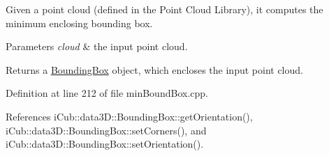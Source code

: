 Given a point cloud (defined in the Point Cloud Library), it computes the minimum enclosing bounding box. 


\begin{DoxyParams}{Parameters}
{\em cloud} & the input point cloud. \\
\hline
\end{DoxyParams}
\begin{DoxyReturn}{Returns}
a \hyperlink{classiCub_1_1data3D_1_1BoundingBox}{Bounding\+Box} object, which encloses the input point cloud. 
\end{DoxyReturn}


Definition at line 212 of file min\+Bound\+Box.\+cpp.



References i\+Cub\+::data3\+D\+::\+Bounding\+Box\+::get\+Orientation(), i\+Cub\+::data3\+D\+::\+Bounding\+Box\+::set\+Corners(), and i\+Cub\+::data3\+D\+::\+Bounding\+Box\+::set\+Orientation().


